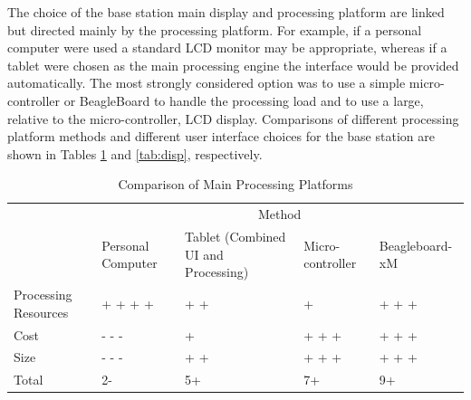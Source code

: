 \documentclass[11pt,letterpaper]{article}
\begin{document}
\quad \newline
The choice of the base station main display and processing platform are linked but directed mainly by the processing platform. For example, if a personal computer were used a standard LCD monitor may be appropriate, whereas if a tablet were chosen as the main processing engine the interface would be provided automatically. The most strongly considered option was to use a simple micro-controller or BeagleBoard to handle the processing load and to use a large, relative to the micro-controller, LCD display. Comparisons of different processing platform methods and different user interface choices for the base station are shown in Tables \ref{tab:proc} and \ref{tab:disp}, respectively.
\begin{table}[h!]
\caption{Comparison of Main Processing Platforms}
\begin{tabular}{| p{1.5in} | p{.75in} | p{1.5in} | p{0.75in} | p{1.15in} | }
\cline{2-5}
\multicolumn{1}{c}{}&\multicolumn{4}{|c|}{Method} \\
\cline{2-5}
\multicolumn{1}{c|}{}&Personal \newline Computer&Tablet (Combined UI \newline and Processing)&Micro-controller & Beagleboard-xM\\
\hline
Processing Resources&+ + + +&+ +&+&+ + +\\
\hline
Cost &- - -& + &+ + +&+ + +\\
\hline
Size&- - -&+ +&+ + +& + + +\\
\hline
\hline
Total &2-&5+&7+& 9+\\
\hline
\end{tabular}
\label{tab:proc}
\end{table}
\end{document}
